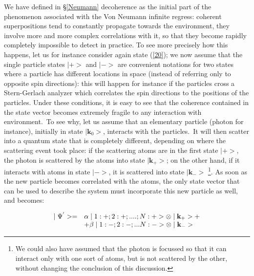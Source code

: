 \documentclass[12pt,onecolumn]{article}%
\begin{document}
We have defined in \S \ref{Neumann} decoherence as the initial part of the
phenomenon associated with the Von Neumann infinite regress: coherent
superpositions tend to constantly propagate towards the environment, they
involve more and more complex correlations with it, so that they become
rapidly completely impossible to detect in practice. To see more precisely how
this happens, let us for instance consider again state (\ref{20}); we now
assume that the single particle states $\mid+>$ and $\mid->$ are convenient
notations for two states where a particle has different locations in space
(instead of referring only to opposite spin directions): this will happen for
instance if the particles cross a Stern-Gerlach analyzer which correlates the
spin directions to the positions of the particles. Under these conditions, it
is easy to see that the coherence contained in the state vector becomes
extremely fragile to any interaction with environment.\ To see why, let us
assume that an elementary particle (photon for instance), initially in state
$\mid\mathbf{k}_{0}>$, interacts with the particles.\ It will then scatter
into a quantum state that is completely different, depending on where the
scattering event took place: if the scattering atoms are in the first state
$\mid+>$, the photon is scattered by the atoms into state $\mid\mathbf{k}%
_{+}>$; on the other hand, if it interacts with atoms in state $\mid->$, it is
scattered into state $\mid\mathbf{k}_{-}>$ \footnote{We could also have
assumed that the photon is focussed so that it can interact only with one sort
of atoms, but is not scattered by the other, without changing the conclusion
of this discussion.}. As soon as the new particle becomes correlated with the
atoms, the only state vector that can be used to describe the system must
incorporate this new particle as well, and becomes:%

\begin{equation}%
\begin{array}
[c]{cl}%
\mid\Psi^{^{\prime}}>= & \alpha\mid1:+;2:+;....;N:+>\otimes\mid\mathbf{k}%
_{+}>+\\
& +\beta\mid1:-;2:-;...N:->\otimes\mid\mathbf{k}_{-}>
\end{array}
\label{23}%
\end{equation}
\end{document}
